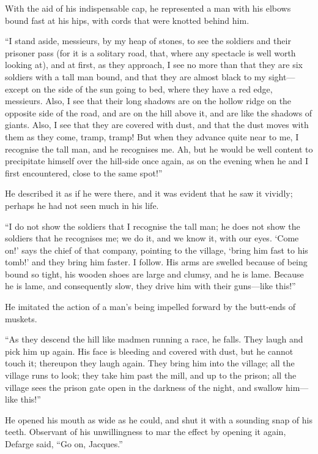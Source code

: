 With the aid of his indispensable cap, he represented a man with his
elbows bound fast at his hips, with cords that were knotted behind him.

``I stand aside, messieurs, by my heap of stones, to see the soldiers
and their prisoner pass (for it is a solitary road, that, where any
spectacle is well worth looking at), and at first, as they approach,
I see no more than that they are six soldiers with a tall man bound,
and that they are almost black to my sight---except on the side of the
sun going to bed, where they have a red edge, messieurs.  Also, I see
that their long shadows are on the hollow ridge on the opposite side
of the road, and are on the hill above it, and are like the shadows of
giants.  Also, I see that they are covered with dust, and that the dust
moves with them as they come, tramp, tramp!  But when they advance
quite near to me, I recognise the tall man, and he recognises me.
Ah, but he would be well content to precipitate himself over the
hill-side once again, as on the evening when he and I first encountered,
close to the same spot!''

He described it as if he were there, and it was evident that he saw
it vividly; perhaps he had not seen much in his life.

``I do not show the soldiers that I recognise the tall man; he does
not show the soldiers that he recognises me; we do it, and we know it,
with our eyes.  `Come on!' says the chief of that company, pointing to
the village, `bring him fast to his tomb!' and they bring him faster.
I follow.  His arms are swelled because of being bound so tight, his
wooden shoes are large and clumsy, and he is lame.  Because he is lame,
and consequently slow, they drive him with their guns---like this!''

He imitated the action of a man's being impelled forward by the
butt-ends of muskets.

``As they descend the hill like madmen running a race, he falls.
They laugh and pick him up again.  His face is bleeding and covered with
dust, but he cannot touch it; thereupon they laugh again.  They bring
him into the village; all the village runs to look; they take him past
the mill, and up to the prison; all the village sees the prison gate
open in the darkness of the night, and swallow him---like this!''

He opened his mouth as wide as he could, and shut it with a sounding
snap of his teeth.  Observant of his unwillingness to mar the effect
by opening it again, Defarge said, ``Go on, Jacques.''

